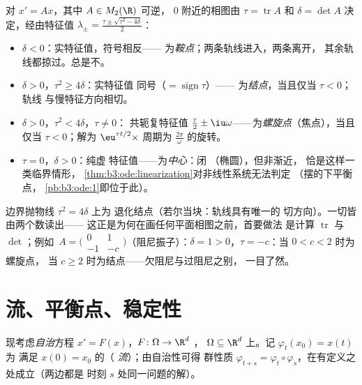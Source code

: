 \begin{example}[平面的分类]
\label{ex:b3:ode:planeclassification}
对 $x' = Ax$，其中 $A \in M_2(\R)$ 可逆，
$0$ 附近的相图由 $\tau = \operatorname{tr}A$
和 $\delta = \det A$ 决定，经由特征值 $\lambda_\pm
= \frac{\tau \pm \sqrt{\tau^2 - 4\delta}}2$：
\begin{itemize}
  \item $\delta < 0$：实特征值，符号相反——
        为\emph{鞍点}；两条轨线进入，两条离开，
        其余轨线都掠过。总是不。
  \item $\delta > 0$，$\tau^2 \geq 4\delta$：实特征值
        同号（$= \operatorname{sign}\tau$）——
        为\emph{结点}，当且仅当 $\tau < 0$；轨线
        与慢特征方向相切。
  \item $\delta > 0$，$\tau^2 < 4\delta$，$\tau \neq 0$：
        共轭复特征值 $\frac\tau2 \pm
        \iu\omega$——为\emph{螺旋点}（焦点），当且仅当
        $\tau < 0$；解为
        $\eu^{\tau t/2}\times$ 周期为
        $\frac{2\pi}\omega$ 的旋转。
  \item $\tau = 0$，$\delta > 0$：纯虚
        特征值——为\emph{中心}：闭
        （椭圆），但非渐近，
        恰是这样一类临界情形，
        \cref{thm:b3:ode:linearization}对非线性系统无法判定
        （摆的下平衡点，
        \cref{pb:b3:ode:1}即位于此）。
\end{itemize}
边界抛物线 $\tau^2 = 4\delta$ 上为
退化结点（若尔当块：轨线具有唯一的
切方向）。一切皆由两个数读出——
这正是为何在画任何平面相图之前，首要做法
是计算 $\operatorname{tr}$ 与 $\det$；例如\
$A = \bigl(\begin{smallmatrix}0 & 1\\ -1 &
-c\end{smallmatrix}\bigr)$（阻尼振子）：$\delta = 1 >
0$，$\tau = -c$：当 $0 < c < 2$ 时为螺旋点，
当 $c \geq 2$ 时为\omterm{def:b3:ode:stability}{稳定}结点——欠阻尼与过阻尼之别，
一目了然。
\end{example}

\section{流、平衡点、稳定性}

现考虑\emph{自治}方程 $x' = F(x)$，$F
\colon \Omega \to \R^d$ ， $\Omega
\subseteq \R^d$ 上。记 $\varphi_t(x_0) = x(t)$ 为
满足 $x(0) = x_0$ 的（
\emph{流}）；由自治性可得
群性质 $\varphi_{t+s} =
\varphi_t\circ\varphi_s$，在有定义之处成立（两边都是
时刻 $s$ 处同一问题的解）。

